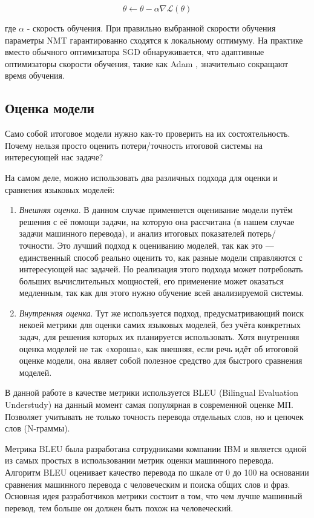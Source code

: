     $$
        \theta \leftarrow \theta - \alpha \nabla \mathscr{L}(\theta)
    $$
    
    где $\alpha$ - скорость обучения. При правильно выбранной скорости обучения параметры NMT гарантированно сходятся к локальному оптимуму. На практике вместо обычного оптимизатора SGD обнаруживается, что адаптивные оптимизаторы скорости обучения, такие как Adam \cite{14}, значительно сокращают время обучения.
	
	\subsection{Оценка модели}
	
	Само собой итоговое модели нужно как-то проверить на их состоятельность. Почему нельзя просто оценить потери/точность итоговой системы на интересующей нас задаче?
	
	На самом деле, можно использовать два различных подхода для оценки и сравнения языковых моделей:
	
	\begin{enumerate}
	    \item \textit{Внешняя оценка}. В данном случае применяется оценивание модели путём решения с её помощи задачи, на которую она рассчитана (в нашем случае задачи машинного перевода), и анализ итоговых показателей потерь/точности. Это лучший подход к оцениванию моделей, так как это — единственный способ реально оценить то, как разные модели справляются с интересующей нас задачей. Но реализация этого подхода может потребовать больших вычислительных мощностей, его применение может оказаться медленным, так как для этого нужно обучение всей анализируемой системы.
	    \item \textit{Внутренняя оценка}. Тут же используется подход, предусматривающий поиск некоей метрики для оценки самих языковых моделей, без учёта конкретных задач, для решения которых их планируется использовать. Хотя внутренняя оценка моделей не так «хороша», как внешняя, если речь идёт об итоговой оценке модели, она являет собой полезное средство для быстрого сравнения моделей.
	\end{enumerate}
	
	В данной работе в качестве метрики используется BLEU (Bilingual Evaluation Understudy) на данный момент самая популярная в современной оценке МП. Позволяет учитывать не только точность перевода отдельных слов, но и цепочек слов (N-граммы).

    Метрика BLEU была разработана сотрудниками компании IBM и является одной из самых простых в использовании метрик оценки машинного перевода. Алгоритм BLEU оценивает качество перевода по шкале от 0 до 100 на основании сравнения машинного перевода с человеческим и поиска общих слов и фраз. Основная идея разработчиков метрики состоит в том, что чем лучше машинный перевод, тем больше он должен быть похож на человеческий.
    
